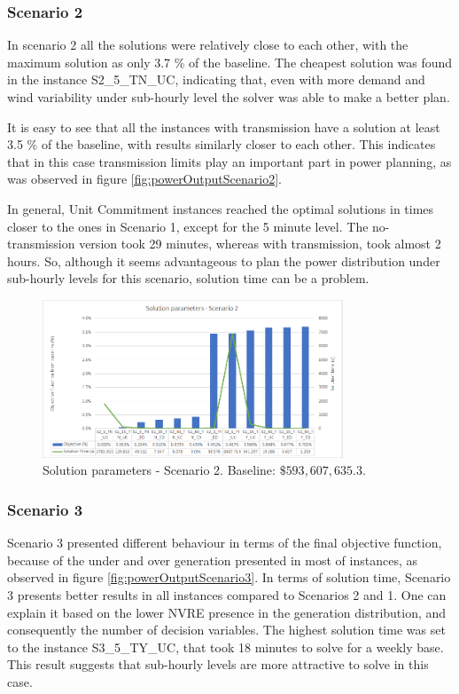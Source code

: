 \documentclass[12pt,LUDisStyle,twosided]{book}
\begin{document}
\subsubsection{Scenario 2}

In scenario 2 all the solutions were relatively close to each other, with the maximum solution as only 3.7 \% of the baseline. The cheapest solution was found in the instance S2\_5\_TN\_UC, indicating that, even with more demand and wind variability under sub-hourly level the solver was able to make a better plan.

It is easy to see that all the instances with transmission have a solution at least 3.5 \% of the baseline, with results similarly closer to each other. This indicates that in this case transmission limits play an important part in power planning, as was observed in figure \ref{fig:powerOutputScenario2}.

In general, Unit Commitment instances reached the optimal solutions in times closer to the ones in Scenario 1, except for the 5 minute level. The no-transmission version took 29 minutes, whereas with transmission, took almost 2 hours. So, although it seems advantageous to plan the power distribution under sub-hourly levels for this scenario, solution time can be a problem.

\begin{figure}[H] 
  \centering  
	  \includegraphics[width=0.8\textwidth,height=\textheight,keepaspectratio]{SolutionParametersS2.png}  
  \caption{Solution parameters - Scenario 2. Baseline: $\$593,607,635.3$.}
  \label{fig:solutionparameterss2}
\end{figure}

\subsubsection{Scenario 3}

Scenario 3 presented different behaviour in terms of the final objective function, because of the under and over generation presented in most of instances, as observed in figure \ref{fig:powerOutputScenario3}. In terms of solution time, Scenario 3 presents better results in all instances compared to Scenarios 2 and 1. One can explain it based on the lower NVRE presence in the generation distribution, and consequently the number of decision variables. The highest solution time was set to the instance S3\_5\_TY\_UC, that took 18 minutes to solve for a weekly base. This result suggests that sub-hourly levels are more attractive to solve in this case.
\end{document}
